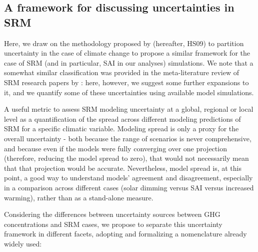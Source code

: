 \documentclass[acp, manuscript]{copernicus}
\begin{document}
\subsection{A framework for discussing uncertainties in SRM}

Here, we draw on the methodology proposed by \cite{Hawkins2009} (hereafter, HS09) to partition uncertainty in the case of climate change to propose a similar framework for the case of SRM (and in particular, SAI in our analyses) simulations. We note that a somewhat similar classification was provided in the meta-literature review of SRM research papers by \cite{maattanen_uncertainties_2024}: here, however, we suggest some further expansions to it, and we quantify some of these uncertainties using available model simulations.

A useful metric to assess SRM modeling uncertainty at a global, regional or local level as a quantification of the spread across different modeling predictions of SRM for a specific climatic variable. Modeling spread is only a proxy for the overall uncertainty - both because the range of scenarios is never comprehensive, and because even if the models were fully converging over one projection (therefore, reducing the model spread to zero), that would not necessarily mean that that projection would be accurate. Nevertheless, model spread is, at this point, a good way to understand models' agreement and disagreement, especially in a comparison across different cases (solar dimming versus SAI versus increased warming), rather than as a stand-alone measure. 

Considering the differences between uncertainty sources between GHG concentrations and SRM cases, we propose to separate this uncertainty framework in different facets, adopting and formalizing a nomenclature already widely used:
\end{document}
